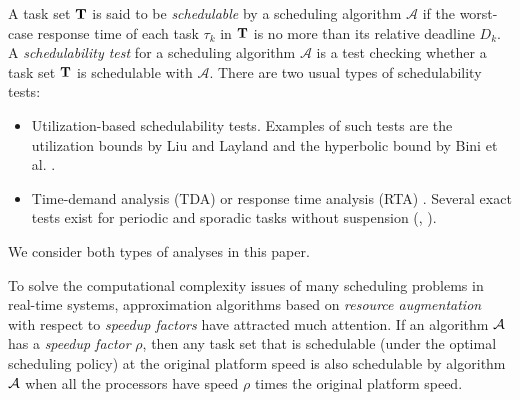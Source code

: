A task set ${\bf T}$ is said to be \emph{schedulable} by a scheduling algorithm $\mathcal{A}$ if the worst-case response time of each task 
$\tau_k$ in ${\bf T}$ is no more than its relative deadline $D_k$.
A \emph{schedulability test} for a scheduling algorithm $\mathcal{A}$ is a test checking whether a task set ${\bf T}$ is schedulable with $\mathcal{A}$. There are
two usual types of schedulability tests:
\begin{itemize}
\item Utilization-based schedulability tests. Examples of such tests are the
  utilization bounds by Liu and Layland \cite{Liu_1973} and the hyperbolic bound by Bini et al. \cite{bini2003rate}.
\item Time-demand analysis (TDA) or response time analysis (RTA) \cite{lehoczky-1989}. Several exact tests exist for periodic and sporadic tasks without suspension (\eg, \cite{Liu_1973,spuri_96, goossens1997non, goossens1999feasibility, zhang2009schedulability}). %
\end{itemize}
We consider both types of analyses in this paper.


To solve the computational complexity issues of many scheduling problems in real-time systems, approximation algorithms based on \textit{resource augmentation} with respect to \emph{speedup factors} have attracted much attention.  If an algorithm ${\cal A}$ has a \emph{speedup factor} $\rho$, then any task set that is schedulable (under the optimal scheduling policy) at the original platform speed is also schedulable by algorithm ${\cal A}$ when all the processors have speed $\rho$ times the original platform speed.


